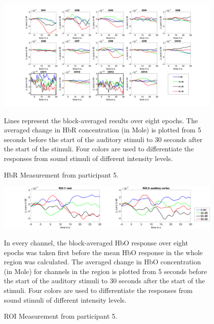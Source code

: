 \begin{figure}[H]
  \centering
    \includegraphics[scale=.4]{bilder/HbR_Mole/sub_lukas_s_HbR.png}
  \caption{HbR Measurement from participant 5.}
  \label{fig:hbr5}
  \medskip
  \footnotesize {Lines represent the block-averaged results over eight epochs. The averaged change in HbR concentration (in Mole) is plotted from 5 seconds before the start of the auditory stimuli to 30 seconds after the start of the stimuli. Four colors are used to differentiate the responses from sound stimuli of different intensity levels.}
\end{figure}

\begin{figure}[H]
  \centering
    \includegraphics[scale=.29]{bilder/ROI/sub_lukas_s_HbO.png}
  \caption{ROI Measurement from participant 5.}
  \label{fig:roi5}
  \medskip
  \footnotesize {In every channel, the block-averaged HbO response over eight epochs was taken first before the mean HbO response in the whole region was calculated. The averaged change in HbO concentration (in Mole) for channels in the region is plotted from 5 seconds before the start of the auditory stimuli to 30 seconds after the start of the stimuli. Four colors are used to differentiate the responses from sound stimuli of different intensity levels.}
\end{figure}



\newpage





